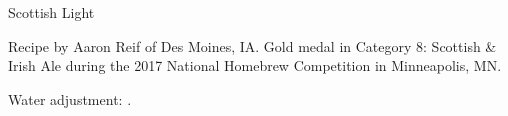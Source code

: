 \begin{recipe}{Scottish Light} %

\begin{aboutblock}
Recipe by Aaron Reif of Des Moines, IA. Gold medal in Category 8: Scottish \& Irish
Ale during the 2017 National Homebrew Competition in Minneapolis, MN.
\sourceaha
\end{aboutblock}


\begin{methodandtiming}

\begin{mashsteps}
\end{mashsteps}

\begin{fermentationsteps}
\end{fermentationsteps}

\begin{directions}
Water adjustment: .
\end{directions}

\end{methodandtiming}

\recipebreak

\begin{ingredientsblock}

\begin{malts}
\end{malts}

\begin{hops}
\end{hops}


\end{ingredientsblock}

\end{recipe}

